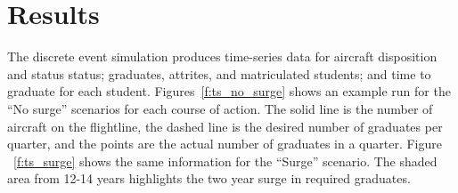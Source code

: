 \documentclass[preprint,12pt]{elsarticle}
\begin{document}
\section{Results}
\label{s:Results}




The discrete event simulation produces time-series data for aircraft
disposition and status status; graduates, attrites, and matriculated
students; and time to graduate for each
student. Figures~\ref{f:ts_no_surge} shows an example run for the ``No
surge'' scenarios for each course of action. The solid line is the number of aircraft on the
flightline, the dashed line is the desired number of graduates per
quarter, and the points are the actual number of graduates in a
quarter. Figure ~\ref{f:ts_surge} shows the same information for the
% 
% 
``Surge'' scenario. The shaded area from 12-14 years highlights the
two year surge in required graduates.
\end{document}

